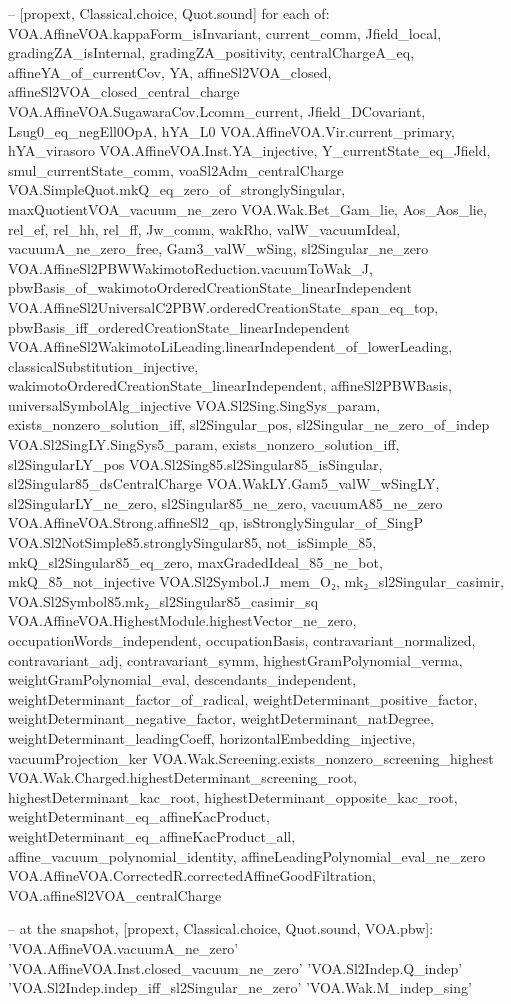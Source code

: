 \begin{plaincode}
-- [propext, Classical.choice, Quot.sound] for each of:
VOA.AffineVOA.{kappaForm_isInvariant, current_comm, Jfield_local, gradingZA_isInternal,
  gradingZA_positivity, centralChargeA_eq, affineYA_of_currentCov, YA, affineSl2VOA_closed,
  affineSl2VOA_closed_central_charge}
VOA.AffineVOA.SugawaraCov.{Lcomm_current, Jfield_DCovariant, Lsug0_eq_negEll0OpA, hYA_L0}
VOA.AffineVOA.Vir.{current_primary, hYA_virasoro}
VOA.AffineVOA.Inst.{YA_injective, Y_currentState_eq_Jfield, smul_currentState_comm,
  voaSl2Adm_centralCharge}
VOA.SimpleQuot.{mkQ_eq_zero_of_stronglySingular, maxQuotientVOA_vacuum_ne_zero}
VOA.Wak.{Bet_Gam_lie, Aos_Aos_lie, rel_ef, rel_hh, rel_ff, Jw_comm, wakRho, valW_vacuumIdeal,
  vacuumA_ne_zero_free, Gam3_valW_wSing, sl2Singular_ne_zero}
VOA.AffineSl2PBWWakimotoReduction.{vacuumToWak_J,
  pbwBasis_of_wakimotoOrderedCreationState_linearIndependent}
VOA.AffineSl2UniversalC2PBW.{orderedCreationState_span_eq_top,
  pbwBasis_iff_orderedCreationState_linearIndependent}
VOA.AffineSl2WakimotoLiLeading.{linearIndependent_of_lowerLeading, classicalSubstitution_injective,
  wakimotoOrderedCreationState_linearIndependent, affineSl2PBWBasis, universalSymbolAlg_injective}
VOA.Sl2Sing.{SingSys_param, exists_nonzero_solution_iff, sl2Singular_pos,
  sl2Singular_ne_zero_of_indep}
VOA.Sl2SingLY.{SingSys5_param, exists_nonzero_solution_iff, sl2SingularLY_pos}
VOA.Sl2Sing85.{sl2Singular85_isSingular, sl2Singular85_dsCentralCharge}
VOA.WakLY.{Gam5_valW_wSingLY, sl2SingularLY_ne_zero, sl2Singular85_ne_zero, vacuumA85_ne_zero}
VOA.AffineVOA.Strong.{affineSl2_qp, isStronglySingular_of_SingP}
VOA.Sl2NotSimple85.{stronglySingular85, not_isSimple_85, mkQ_sl2Singular85_eq_zero,
  maxGradedIdeal_85_ne_bot, mkQ_85_not_injective}
VOA.Sl2Symbol.{J_mem_O₂, mk₂_sl2Singular_casimir}, VOA.Sl2Symbol85.mk₂_sl2Singular85_casimir_sq
VOA.AffineVOA.HighestModule.{highestVector_ne_zero, occupationWords_independent, occupationBasis,
  contravariant_normalized, contravariant_adj, contravariant_symm, highestGramPolynomial_verma,
  weightGramPolynomial_eval, descendants_independent, weightDeterminant_factor_of_radical,
  weightDeterminant_positive_factor, weightDeterminant_negative_factor, weightDeterminant_natDegree,
  weightDeterminant_leadingCoeff, horizontalEmbedding_injective, vacuumProjection_ker}
VOA.Wak.Screening.exists_nonzero_screening_highest
VOA.Wak.Charged.{highestDeterminant_screening_root, highestDeterminant_kac_root,
  highestDeterminant_opposite_kac_root, weightDeterminant_eq_affineKacProduct,
  weightDeterminant_eq_affineKacProduct_all, affine_vacuum_polynomial_identity,
  affineLeadingPolynomial_eval_ne_zero}
VOA.AffineVOA.CorrectedR.correctedAffineGoodFiltration, VOA.affineSl2VOA_centralCharge

-- at the snapshot, [propext, Classical.choice, Quot.sound, VOA.pbw]:
'VOA.AffineVOA.vacuumA_ne_zero'
'VOA.AffineVOA.Inst.closed_vacuum_ne_zero'
'VOA.Sl2Indep.Q_indep'
'VOA.Sl2Indep.indep_iff_sl2Singular_ne_zero'
'VOA.Wak.M_indep_sing'
\end{plaincode}
